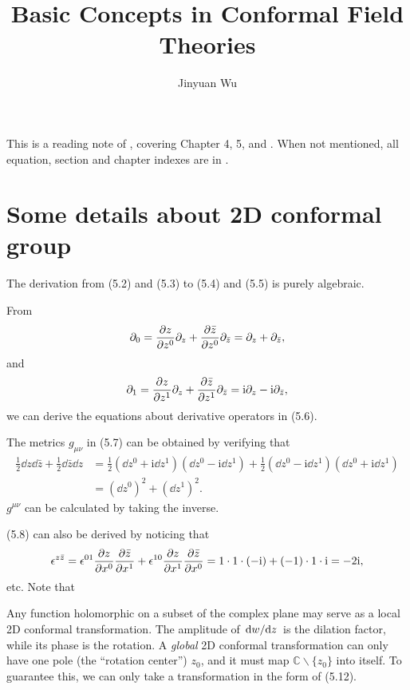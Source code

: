 \documentclass[hyperref, a4paper]{article}
\title{Basic Concepts in Conformal Field Theories}
\author{Jinyuan Wu}
\newcommand*{\ii}{\mathrm{i}}
\begin{document}
\maketitle

This is a reading note of \cite{francesco2012conformal}, covering Chapter 4, 5, and \cite{blumenhagen2009introduction}. %
When not mentioned, all equation, section and chapter indexes are in \cite{francesco2012conformal}.

\section{Some details about 2D conformal group}

The derivation from (5.2) and (5.3) to (5.4) and (5.5) is purely algebraic. 

From 
\[
    \partial_0 = \pdv{z}{z^0} \partial_z + \pdv{\bar{z}}{z^0} \partial_{\bar{z}} = \partial_z + \partial_{\bar{z}},
\]
and 
\[
    \partial_1 = \pdv{z}{z^1} \partial_z + \pdv{\bar{z}}{z^1} \partial_{\bar{z}} = \ii \partial_z - \ii \partial_{\bar{z}},
\]
we can derive the equations about derivative operators in (5.6).

The metrics $g_{\mu \nu}$ in (5.7) can be obtained by verifying that 
\[
    \begin{aligned}
        \frac{1}{2} \dd{z} \dd{\bar{z}} + \frac{1}{2} \dd{\bar{z}} \dd{z} &= 
        \frac{1}{2} (\dd{z^0} + \ii \dd{z^1}) (\dd{z^0} - \ii \dd{z^1})
        +  \frac{1}{2} (\dd{z^0} - \ii \dd{z^1}) (\dd{z^0} + \ii \dd{z^1}) \\
        &= (\dd{z^0})^2 + (\dd{z^1})^2.
    \end{aligned}
\]
$g^{\mu \nu}$ can be calculated by taking the inverse.

(5.8) can also be derived by noticing that 
\[
    \epsilon^{z \bar{z}} = \epsilon^{01} \pdv{z}{x^0} \pdv{\bar{z}}{x^1} + \epsilon^{10} \pdv{z}{x^1} \pdv{\bar{z}}{x^0} = 1 \cdot 1 \cdot (-\ii) + (-1) \cdot 1 \cdot \ii = - 2 \ii,
\]
etc. Note that %

Any function holomorphic on a subset of the complex plane may serve as a local 2D conformal transformation. 
The amplitude of $\dv*{w}{z}$ is the dilation factor, while its phase is the rotation.
A \emph{global} 2D conformal transformation can only have one pole (the ``rotation center'') $z_0$, and it must 
map $\mathbb{C} \backslash \{z_0\}$ into itself. To guarantee this, we can only take a transformation in the form of 
(5.12). 
\end{document}
